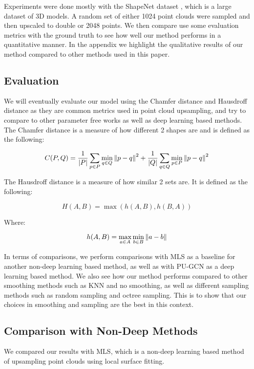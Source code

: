 Experiments were done mostly with the ShapeNet dataset \cite{shapenet}, which is a large dataset of 3D models. 
A random set of either 1024 point clouds were sampled and then upscaled to double or 2048 points.
We then compare use some evaluation metrics with the ground truth to see how well our method performs in a quantitative manner.
In the appendix we highlight the qualitative results of our method compared to other methods used in this paper.


\subsection{Evaluation}

We will eventually evaluate our model using the Chamfer distance and Hausdroff distance as they are common metrics used in point cloud upsampling, and try to compare to other parameter free works as well as deep learning based methods.
The Chamfer distance is a measure of how different 2 shapes are and is defined as the following:

$$ C(P, Q) = \dfrac{1}{|P|} \sum\limits_{p \in P} \min_{q \in Q} \left\lVert p - q\right\rVert^2 +  \dfrac{1}{|Q|} \sum\limits_{q \in Q} \min_{p \in P} \left\lVert p - q\right\rVert^2 \label{eq:chamfer}$$

The Hausdroff distance is a measure of how similar 2 sets are. It is defined as the following:

$$ H(A, B) = \max(h(A, B), h(B, A))\label{eq:hausdroff}$$

Where:

$$h(A, B) = \max_{a \in A} \min_{b \in B} \left\lVert a - b\right\rVert$$

In terms of comparisons, we perform comparisons with MLS as a baseline for another non-deep learning based method, as well as with PU-GCN as a deep learning based method.
We also see how our method performs compared to other smoothing methods such as KNN and no smoothing, as well as different sampling methods such as random sampling and octree sampling.
This is to show that our choices in smoothing and sampling are the best in this context.

\subsection{Comparison with Non-Deep Methods}

We compared our results with MLS, which is a non-deep learning based method of upsampling point clouds using local surface fitting.

